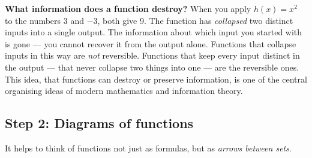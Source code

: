 \documentclass[12pt, a4paper]{article}
\begin{document}
\begin{thought}
\textbf{What information does a function destroy?}
When you apply $h(x) = x^2$ to the numbers $3$ and $-3$, both give 9. The function has \emph{collapsed} two distinct inputs into a single output. The information about which input you started with is gone --- you cannot recover it from the output alone. Functions that collapse inputs in this way are \emph{not} reversible. Functions that keep every input distinct in the output --- that never collapse two things into one --- are the reversible ones. This idea, that functions can destroy or preserve information, is one of the central organising ideas of modern mathematics and information theory.
\end{thought}

\subsection{Step 2: Diagrams of functions}

It helps to think of functions not just as formulas, but as \emph{arrows between sets}.

\begin{center}
\end{center}
\end{document}
